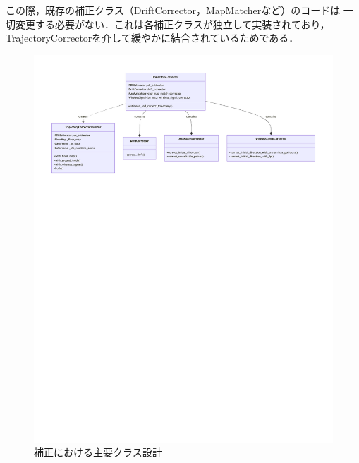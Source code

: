 この際，既存の補正クラス（DriftCorrector，MapMatcherなど）のコードは
一切変更する必要がない．これは各補正クラスが独立して実装されており，
TrajectoryCorrectorを介して緩やかに結合されているためである．

\begin{figure}[H]
    \centering
    \includegraphics[width=\linewidth]{image/corrector-class-diagram.pdf}
    \caption{補正における主要クラス設計}
    \label{fig:corrector-class}
\end{figure}



